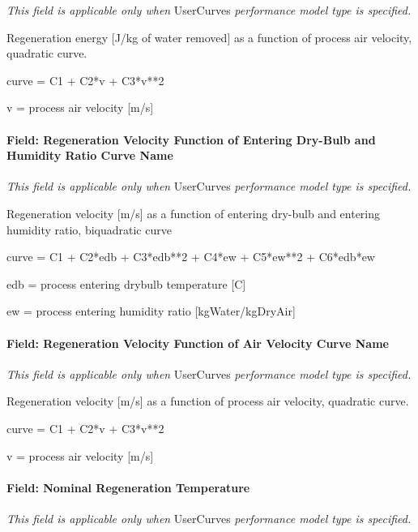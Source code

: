 \emph{This field is applicable only when} UserCurves \emph{performance model type is specified.}

Regeneration energy {[}J/kg of water removed{]} as a function of process air velocity, quadratic curve.

curve = C1 + C2*v + C3*v**2

v = process air velocity {[}m/s{]}

\paragraph{Field: Regeneration Velocity Function of Entering Dry-Bulb and Humidity Ratio Curve Name}\label{field-regeneration-velocity-function-of-entering-dry-bulb-and-humidity-ratio-curve-name}

\emph{This field is applicable only when} UserCurves \emph{performance model type is specified.}

Regeneration velocity {[}m/s{]} as a function of entering dry-bulb and entering humidity ratio, biquadratic curve

curve = C1 + C2*edb + C3*edb**2 + C4*ew + C5*ew**2 + C6*edb*ew

edb = process entering drybulb temperature {[}C{]}

ew = process entering humidity ratio {[}kgWater/kgDryAir{]}

\paragraph{Field: Regeneration Velocity Function of Air Velocity Curve Name}\label{field-regeneration-velocity-function-of-air-velocity-curve-name}

\emph{This field is applicable only when} UserCurves \emph{performance model type is specified.}

Regeneration velocity {[}m/s{]} as a function of process air velocity, quadratic curve.

curve = C1 + C2*v + C3*v**2

v = process air velocity {[}m/s{]}

\paragraph{Field: Nominal Regeneration Temperature}\label{field-nominal-regeneration-temperature}

\emph{This field is applicable only when} UserCurves \emph{performance model type is specified.}

